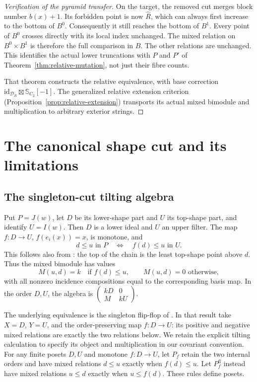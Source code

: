 \documentclass[11pt]{article}
\theoremstyle{definition}
\begin{document}
\begin{proof}[Verification of the pyramid transfer]
On the target, the removed cut merges block number $b(x)+1$.
Its forbidden point is now $\widehat R$, which can always first
increase to the bottom of $B^0$. Consequently it still reaches
the bottom of $B^1$. Every point of $B^0$ crosses directly with
its local index unchanged. The mixed relation on $B^0\times B^1$
is therefore the full comparison in $B$. The other relations
are unchanged. This identifies the actual lower truncations
with $P$ and $P'$ of Theorem~\ref{thm:relative-mutation}, not just
their fibre counts.

That theorem constructs the relative equivalence, with base
correction $\mathrm{id}_{\mathcal D_R}\boxtimes\mathbb S_{C_2}[-1]$.
The generalized relative extension criterion
(Proposition~\ref{prop:relative-extension}) transports its actual
mixed bimodule and multiplication to arbitrary exterior strings.
\end{proof}

\section{The canonical shape cut and its limitations}
\label{app:shape}
\subsection{The singleton-cut tilting algebra}
Put $P=J(w)$, let $D$ be its lower-shape part and $U$ its top-shape
part, and identify $U=I(w)$. Then $D$ is a lower ideal and $U$ an
upper filter. The map $f:D\to U$, $f(e_i(x))=x$, is monotone, and
\begin{equation}\label{eq:mixed}
 d\leq u\text{ in }P\quad\Longleftrightarrow\quad f(d)\leq u
 \text{ in }U.
\end{equation}
This follows also from \cite[Proposition 5.6]{Chapoton}: the top of
the chain is the least top-shape point above $d$. Thus the mixed
bimodule has values
\[
 M(u,d)=k\quad\text{if }f(d)\leq u,\qquad M(u,d)=0\text{ otherwise},
\]
with all nonzero incidence compositions equal to the corresponding
basis map. In the order $D,U$, the algebra is
$\left(\begin{smallmatrix} kD&0\\M&kU\end{smallmatrix}\right)$.

The underlying equivalence is the singleton flip-flop of
\cite[Corollary 1.3]{LadkaniPosets}. In that result take
$X=D$, $Y=U$, and the order-preserving map $f:D\to U$:
its positive and negative mixed relations are exactly the two
relations below. We retain the explicit tilting calculation to
specify its object and multiplication in our covariant convention.
For any finite posets $D,U$ and monotone $f:D\to U$, let $P_f$ retain
the two internal orders and have mixed relations $d\leq u$ exactly
when $f(d)\leq u$. Let $P_f^{\mathrm{fl}}$ instead have mixed relations
$u\leq d$ exactly when $u\leq f(d)$. These rules define posets.
\end{document}
